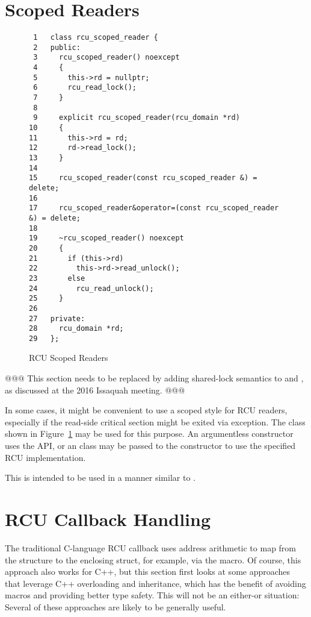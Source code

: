 \documentclass[letterpaper,10pt]{article}
\begin{document}
\section{Scoped Readers}
\label{sec:Scoped Readers}

\begin{figure}[tbp]
{ \scriptsize
\begin{verbatim}
 1   class rcu_scoped_reader {
 2   public:
 3     rcu_scoped_reader() noexcept
 4     {
 5       this->rd = nullptr;
 6       rcu_read_lock();
 7     }
 8
 9     explicit rcu_scoped_reader(rcu_domain *rd)
10     {
11       this->rd = rd;
12       rd->read_lock();
13     }
14
15     rcu_scoped_reader(const rcu_scoped_reader &) = delete;
16
17     rcu_scoped_reader&operator=(const rcu_scoped_reader &) = delete;
18
19     ~rcu_scoped_reader() noexcept
20     {
21       if (this->rd)
22         this->rd->read_unlock();
23       else
24         rcu_read_unlock();
25     }
26
27   private:
28     rcu_domain *rd;
29   };
\end{verbatim}
}
\caption{RCU Scoped Readers}
\label{fig:RCU Scoped Readers}
\end{figure}

@@@ This section needs to be replaced by adding shared-lock semantics
to  and , as discussed at
the 2016 Issaquah meeting. @@@

In some cases, it might be convenient to use a scoped style for RCU readers,
especially if the read-side critical section might be exited via exception.
The  class shown in
Figure~\ref{fig:RCU Scoped Readers}
may be used for this purpose.
An argumentless constructor uses the API, or an  class
may be passed to the constructor to use the specified RCU
implementation.

This is intended to be used in a manner similar to
.

\section{RCU Callback Handling}
\label{sec:RCU Callback Handling}

The traditional C-language RCU callback uses address arithmetic
to map from the  structure to the enclosing struct,
for example, via the  macro.
Of course, this approach also works for C++, but this section first
looks at some approaches that leverage C++ overloading and inheritance,
which has the benefit of avoiding macros and providing better type safety.
This will not be an either-or situation: Several of these approaches
are likely to be generally useful.
\end{document}
